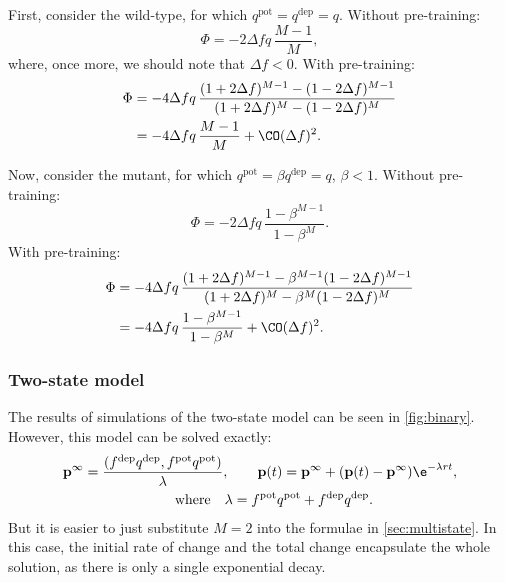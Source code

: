 \documentclass[12pt]{article}
\newcommand{\pr}{\mathbf{p}}
\newcommand{\eq}{\pr^\infty}
\newcommand{\pot}{^{\text{pot}}}
\newcommand{\dep}{^{\text{dep}}}
\begin{document}
First, consider the wild-type, for which $q\pot=q\dep=q$.
Without pre-training:
%
\begin{equation}\label{eq:multiLinWTnopre}
  \Phi = -2\Delta fq\,\frac{M-1}{M},
\end{equation}
%
where, once more, we should note that $\Delta f<0$.
With pre-training:
%
\begin{equation}\label{eq:multiLinWTpre}
\begin{aligned}
  \Phi &= -4\Delta f q \, \frac{(1+2\Delta f)^{M-1} - (1-2\Delta f)^{M-1}}
          {(1+2\Delta f)^M - (1-2\Delta f)^M} \\
       &= -{4\Delta f q}\,\frac{M-1}{M} + \CO(\Delta f)^2.
\end{aligned}
\end{equation}
%

Now, consider the mutant, for which $q\pot=\beta q\dep=q$, $\beta<1$.
Without pre-training:
%
\begin{equation}\label{eq:multiLinKOnopre}
  \Phi = -2\Delta f q\,\frac{1-\beta^{M-1}}{1-\beta^M}.
\end{equation}
%
With pre-training:
%
\begin{equation}\label{eq:multiLinKOpre}
\begin{aligned}
  \Phi &= -4\Delta f q \, \frac{(1+2\Delta f)^{M-1} - \beta^{M-1}(1-2\Delta f)^{M-1}}
          {(1+2\Delta f)^M - \beta^M(1-2\Delta f)^M} \\
       &= -4\Delta f q\,\frac{1-\beta^{M-1}}{1-\beta^M} + \CO(\Delta f)^2.
\end{aligned}
\end{equation}
%





\subsubsection{Two-state model}\label{sec:binary}




The results of simulations of the two-state model can be seen in \autoref{fig:binary}.
However, this model can be solved exactly:
%
\begin{multline}\label{eq:binarysol}
  \eq = \frac{(f\dep q\dep, f\pot q\pot)}{\lambda},
  \qquad
  \pr(t) = \eq + (\pr(t)-\eq)\e^{-\lambda rt},\\
  \qquad \text{where} \quad
  \lambda = f\pot q\pot + f\dep q\dep.
\end{multline}
%
But it is easier to just substitute $M=2$ into the formulae in \autoref{sec:multistate}.
In this case, the initial rate of change and the total change encapsulate the whole solution, as there is only a single exponential decay.
\end{document}
